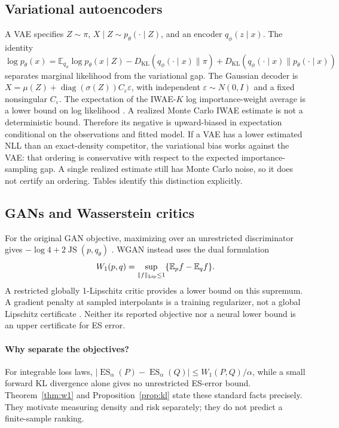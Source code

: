 \documentclass[11pt]{article}
\theoremstyle{definition}\newtheorem{definition}[theorem]{Definition}
\theoremstyle{remark}\newtheorem{remark}[theorem]{Remark}
\newcommand{\E}{\mathbb E}\newcommand{\Prob}{\mathbb P}\newcommand{\R}{\mathbb R}
\newcommand{\KL}{D_{\mathrm{KL}}}\newcommand{\ES}{\operatorname{ES}}\newcommand{\VaR}{\operatorname{VaR}}
\newcommand{\Wone}{W_1}\newcommand{\ind}{\mathbf 1}\newcommand{\softplus}{\operatorname{softplus}}
\begin{document}
\subsection{Variational autoencoders}
A VAE specifies $Z\sim\pi$, $X\mid Z\sim p_\theta(\cdot\mid Z)$, and an encoder $q_\phi(z\mid x)$. The identity
\begin{equation}\label{eq:elbo}
\log p_\theta(x)=\E_{q_\phi}\log p_\theta(x\mid Z)-\KL(q_\phi(\cdot\mid x)\|\pi)
+\KL(q_\phi(\cdot\mid x)\|p_\theta(\cdot\mid x))
\end{equation}
separates marginal likelihood from the variational gap. The Gaussian decoder is $X=\mu(Z)+\operatorname{diag}(\sigma(Z))C_\varepsilon\varepsilon$, with independent $\varepsilon\sim N(0,I)$ and a fixed nonsingular $C_\varepsilon$. The expectation of the IWAE-$K$ log importance-weight average is a lower bound on log likelihood \citep{burda2016iwae}. A realized Monte Carlo IWAE estimate is not a deterministic bound. Therefore its negative is upward-biased in expectation conditional on the observations and fitted model. If a VAE has a lower estimated NLL than an exact-density competitor, the variational bias works against the VAE: that ordering is conservative with respect to the expected importance-sampling gap. A single realized estimate still has Monte Carlo noise, so it does not certify an ordering. Tables identify this distinction explicitly.

\subsection{GANs and Wasserstein critics}
For the original GAN objective, maximizing over an unrestricted discriminator gives $-\log4+2\operatorname{JS}(p,q_\theta)$ \citep{goodfellow2014gan}. WGAN instead uses the dual formulation
\begin{equation}\label{eq:wgan}
\Wone(p,q)=\sup_{\|f\|_{\rm Lip}\le1}\{\E_pf-\E_qf\}.
\end{equation}
A restricted globally 1-Lipschitz critic provides a lower bound on this supremum. A gradient penalty at sampled interpolants is a training regularizer, not a global Lipschitz certificate \citep{arjovsky2017wgan,gulrajani2017wgangp}. Neither its reported objective nor a neural lower bound is an upper certificate for ES error.

\paragraph{Why separate the objectives?}
For integrable loss laws, $|\ES_\alpha(P)-\ES_\alpha(Q)|\le W_1(P,Q)/\alpha$, while a small forward KL divergence alone gives no unrestricted ES-error bound. Theorem~\ref{thm:w1} and Proposition~\ref{prop:kl} state these standard facts precisely. They motivate measuring density and risk separately; they do not predict a finite-sample ranking.
\end{document}

